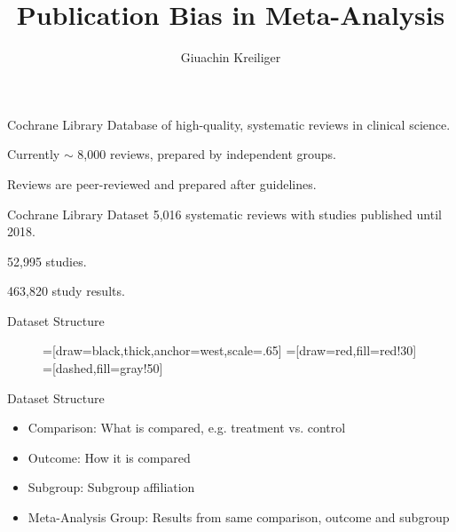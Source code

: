 \documentclass[english]{beamer}\usepackage[]{graphicx}\usepackage[]{color}
\title{Publication Bias in Meta-Analysis}%
\author{Giuachin Kreiliger}
\begin{document}
\maketitle

\begin{frame}{Cochrane Library}
Database of high-quality, systematic reviews in clinical science.

Currently $\sim$ 8,000 reviews, prepared by independent groups. 

Reviews are peer-reviewed and prepared after guidelines.
\end{frame}


\begin{frame}{Cochrane Library Dataset}
5,016 systematic reviews with studies published until 2018.

52,995 studies.

463,820 study results.
\end{frame}


\begin{frame}{Dataset Structure}

\begin{figure}
=[draw=black,thick,anchor=west,scale=.65]
=[draw=red,fill=red!30]
=[dashed,fill=gray!50]
\label{review.structure}
\end{figure}
\end{frame}


\begin{frame}{Dataset Structure}
\begin{itemize}
\item Comparison: What is compared, e.g. treatment vs. control
\item Outcome: How it is compared
\item Subgroup: Subgroup affiliation
\item Meta-Analysis Group: Results from same comparison, outcome and subgroup
\end{itemize}
\end{frame}
\end{document}
